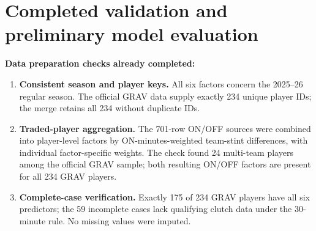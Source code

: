 \documentclass[11pt]{article}
\begin{document}
\section{Completed validation and preliminary model evaluation}
\label{sec:model-evaluation}
\textbf{Data preparation checks already completed:}
\begin{enumerate}
\item \textbf{Consistent season and player keys.} All six factors concern
the 2025--26 regular season. The official GRAV data supply exactly 234
unique player IDs; the merge retains all 234 without duplicate IDs.
\item \textbf{Traded-player aggregation.} The 701-row ON/OFF sources were
combined into player-level factors by ON-minutes-weighted team-stint
differences, with individual factor-specific weights. The check found
24 multi-team players among the official GRAV sample; both resulting
ON/OFF factors are present for all 234 GRAV players.
\item \textbf{Complete-case verification.} Exactly 175 of 234 GRAV players
have all six predictors; the 59 incomplete cases lack qualifying clutch
data under the 30-minute rule. No missing values were imputed.
\end{enumerate}
\end{document}
